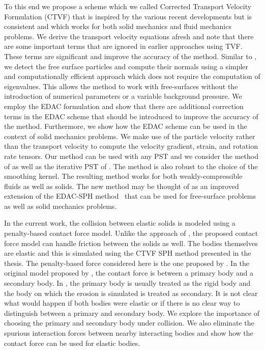 To this end we propose a scheme which we called Corrected Transport Velocity
Formulation (CTVF) that is inspired by the various recent developments but is
consistent and which works for both solid mechanics and fluid mechanics
problems. We derive the transport velocity equations afresh and note that there
are some important terms that are ignored in earlier approaches using TVF. These
terms are significant and improve the accuracy of the method. Similar to
\textcite{oger_ale_sph_2016,sun_consistent_2019}, we detect the free surface
particles and compute their normals using a simpler and computationally
efficient approach which does not require the computation of eigenvalues. This
allows the method to work with free-surfaces without the introduction of
numerical parameters or a variable background pressure. We employ the EDAC
formulation and show that there are additional correction terms in the EDAC
scheme that should be introduced to improve the accuracy of the method.
Furthermore, we show how the EDAC scheme can be used in the context of solid
mechanics problems. We make use of the particle velocity rather than the
transport velocity to compute the velocity gradient, strain, and rotation rate
tensors. Our method can be used with any PST and we consider the method of
\textcite{sun_consistent_2019} as well as the iterative PST of
\textcite{huang_kernel_2019}. The method is also robust to the choice of the
smoothing kernel. The resulting method works for both weakly-compressible fluids
as well as solids. The new method may be thought of as an improved extension of
the EDAC-SPH method~\parencite{edac-sph:cf:2019} that can be used for free-surface
problems as well as solid mechanics problems.


In the current work, the collision between elastic solids is modeled using a
penalty-based contact force model. Unlike the approach of
\textcite{yan2021simulation}, the proposed contact force model can handle friction
between the solids as well. The bodies themselves are elastic and this is
simulated using the CTVF SPH method \textcite{adepu2021corrected} presented in the
thesis. The penalty-based force considered here is the one proposed by
\textcite{mohseni2021particle}. In the original model proposed by
\textcite{mohseni2021particle}, the contact force is between a primary body and a
secondary body. In \textcite{mohseni2021particle}, the primary body is usually
treated as the rigid body and the body on which the erosion is simulated is
treated as secondary. It is not clear what would happen if both bodies were
elastic or if there is no clear way to distinguish between a primary and
secondary body. We explore the importance of choosing the primary and secondary
body under collision. We also eliminate the spurious interaction forces between
nearby interacting bodies and show how the contact force can be used for elastic
bodies.

